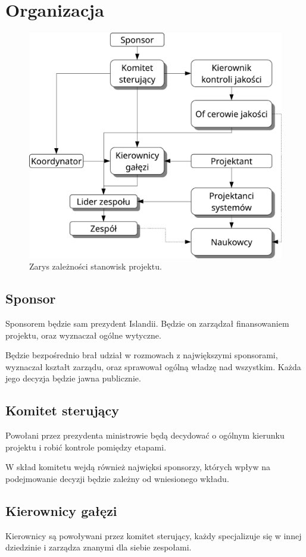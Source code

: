 \section{Organizacja} 
\begin{figure}[H]
\centering
 \includegraphics[width=\textwidth]{img/struktura.pdf}
\caption{Zarys zależności stanowisk projektu.}
\end{figure}
\subsection{Sponsor}
Sponsorem będzie sam prezydent Islandii.
Będzie on zarządzał finansowaniem projektu, oraz wyznaczał ogólne wytyczne.

Będzie bezpośrednio brał udział w rozmowach z największymi sponsorami, wyznaczał kształt zarządu, oraz sprawował ogólną władzę nad wszystkim.
Każda jego decyzja będzie jawna publicznie.

\subsection{Komitet sterujący}
Powołani przez prezydenta ministrowie będą decydować o ogólnym kierunku projektu i robić kontrole pomiędzy etapami.

W skład komitetu wejdą również najwięksi sponsorzy, których wpływ na podejmowanie decyzji będzie zależny od wniesionego wkładu.

\subsection{Kierownicy gałęzi}
Kierownicy są powoływani przez komitet sterujący, każdy specjalizuje się w innej dziedzinie i zarządza znanymi dla siebie zespołami.

